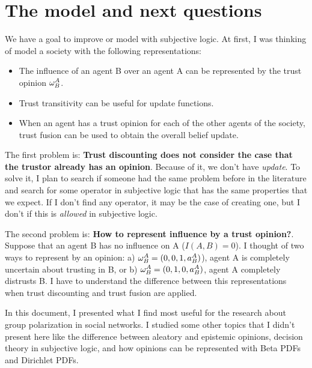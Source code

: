 \documentclass[a4paper,12pt]{article}
\theoremstyle{definition}
\numberwithin{equation}{section}
\begin{document}
\section{The model and next questions}

We have a goal to improve or model with subjective logic. At first, I was thinking of model a society with the following representations:
\begin{itemize}
	\item The influence of an agent B over an agent A can be represented by the trust opinion $\omega^{A}_{B}$.
	
	\item Trust transitivity can be useful for update functions.
	
	\item When an agent has a trust opinion for each of the other agents of the society, trust fusion can be used to obtain the overall belief update.
\end{itemize}

The first problem is: \textbf{Trust discounting does not consider the case that the trustor already has an opinion}. Because of it, we don't have \emph{update}. To solve it, I plan to search if someone had the same problem before in the literature and search for some operator in subjective logic that has the same properties that we expect. If I don't find any operator, it may be the case of creating one, but I don't if this is \emph{allowed} in subjective logic.

The second problem is: \textbf{How to represent influence by a trust opinion?}. Suppose that an agent B has no influence on A ($I(A, B) = 0$). I thought of two ways to represent by an opinion: a) $\omega^{A}_{B} = (0, 0, 1, a^A_B)$), agent A is completely uncertain about trusting in B, or b) $\omega^{A}_{B} = (0, 1, 0, a^A_B)$, agent A completely distrusts B. I have to understand the difference between this representations when trust discounting and trust fusion are applied.

In this document, I presented what I find most useful for the research about group polarization in social networks. I studied some other topics that I didn't present here like the difference between aleatory and epistemic opinions, decision theory in subjective logic, and how opinions can be represented with Beta PDFs and Dirichlet PDFs.
\end{document}
